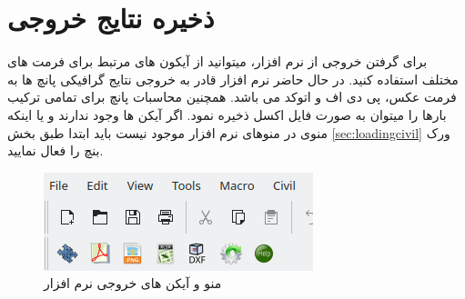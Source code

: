 \section{ذخیره نتایج خروجی}
برای گرفتن خروجی از نرم افزار، میتوانید از آیکون های مرتبط برای فرمت های مختلف استفاده کنید. در حال حاضر نرم افزار قادر به خروجی نتایج گرافیکی پانچ ها به فرمت عکس، 
پی دی اف و اتوکد می باشد. همچنین محاسبات پانچ برای تمامی ترکیب بارها را میتوان به صورت فایل اکسل ذخیره نمود. اگر آیکن ها وجود ندارند و یا اینکه منوی 
در منوهای نرم افزار موجود نیست باید ابتدا طبق بخش
\ref{sec:loadingcivil}
ورک بنچ را فعال نمایید.

\begin{figure}[H]
    \centering
    \includegraphics{figures/export}
    \caption{منو و آیکن های خروجی نرم افزار}
\end{figure}